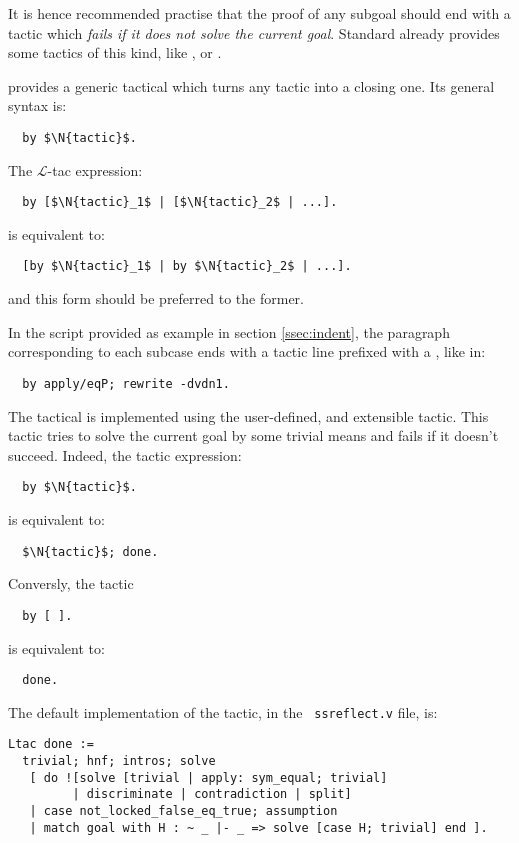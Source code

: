 It is hence recommended practise that the proof of any subgoal should
end with a tactic which \emph{fails if it does not solve the current
  goal}. Standard \Coq{} already provides some tactics of this kind,
like ,  or .

\ssr{} provides a generic tactical which turns any tactic into a closing
one. Its general syntax is:
\begin{lstlisting}
  by $\N{tactic}$.
\end{lstlisting}
The $\mathcal{L}$-tac expression:
\begin{lstlisting}
  by [$\N{tactic}_1$ | [$\N{tactic}_2$ | ...].
\end{lstlisting}
is equivalent to:
\begin{lstlisting}
  [by $\N{tactic}_1$ | by $\N{tactic}_2$ | ...].
\end{lstlisting}
and this form should be preferred to the former.

In the script provided as example in section \ref{ssec:indent}, the
paragraph corresponding to each subcase ends with a tactic line prefixed
with a , like in:
\begin{lstlisting}
  by apply/eqP; rewrite -dvdn1.
\end{lstlisting}

The  tactical is implemented using the user-defined,
and extensible  tactic. This  tactic tries to solve
the current goal by some trivial means and fails if it doesn't succeed.
Indeed, the tactic expression:
\begin{lstlisting}
  by $\N{tactic}$.
\end{lstlisting}
is equivalent to:
\begin{lstlisting}
  $\N{tactic}$; done.
\end{lstlisting}
Conversly, the tactic
\begin{lstlisting}
  by [ ].
\end{lstlisting}
is equivalent to:
\begin{lstlisting}
  done.
\end{lstlisting}
The default implementation of the  tactic, in the {\tt
  ssreflect.v} file, is:

\begin{lstlisting}
Ltac done :=
  trivial; hnf; intros; solve
   [ do ![solve [trivial | apply: sym_equal; trivial]
         | discriminate | contradiction | split]
   | case not_locked_false_eq_true; assumption
   | match goal with H : ~ _ |- _ => solve [case H; trivial] end ].
\end{lstlisting}

